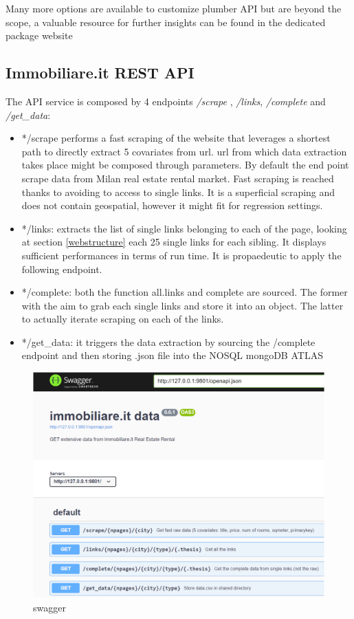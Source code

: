 \documentclass[
  12pt,
  a4paper,
  oneside]{book}
\theoremstyle{definition}
\theoremstyle{definition}
\theoremstyle{definition}
\theoremstyle{remark}
\begin{document}
Many more options are available to customize plumber API but are beyond the scope, a valuable resource for further insights can be found in the dedicated package website \citep{an_api_generator_for_r}

\hypertarget{immobiliare.it-rest-api}{%
\subsection{Immobiliare.it REST API}\label{immobiliare.it-rest-api}}

The API service is composed by 4 endpoints \emph{/scrape} , \emph{/links}, \emph{/complete} and \emph{/get\_data}:

\begin{itemize}
\item
  */scrape performs a fast scraping of the website that leverages a shortest path to directly extract 5 covariates from url. url from which data extraction takes place might be composed through parameters. By default the end point scrape data from Milan real estate rental market. Fast scraping is reached thanks to avoiding to access to single links. It is a superficial scraping and does not contain geospatial, however it might fit for regression settings.
\item
  */links: extracts the list of single links belonging to each of the page, looking at section \ref{webstructure} each 25 single links for each sibling. It displays sufficient performances in terms of run time. It is propaedeutic to apply the following endpoint.
\item
  */complete: both the function all.links and complete are sourced. The former with the aim to grab each single links and store it into an object. The latter to actually iterate scraping on each of the links.
\item
  */get\_data: it triggers the data extraction by sourcing the /complete endpoint and then storing .json file into the NOSQL mongoDB ATLAS
\end{itemize}

\begin{figure}
\centering
\includegraphics{images/swagger.PNG}
\caption{swagger}
\end{figure}
\end{document}
